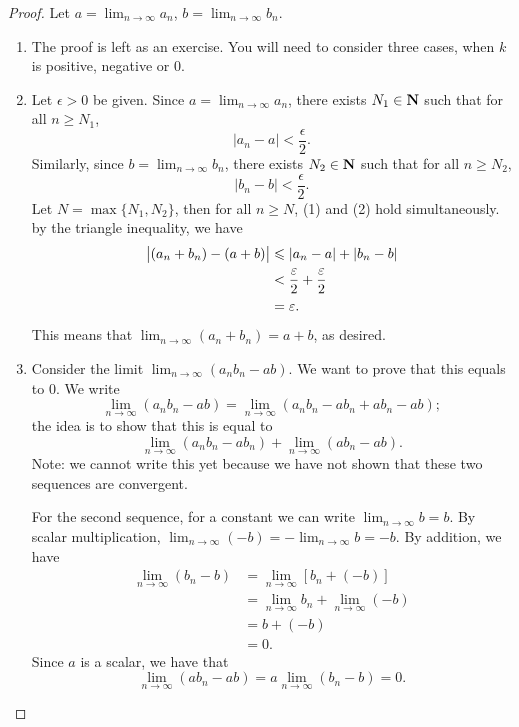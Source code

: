 \begin{proof}
Let $\displaystyle a=\lim_{n\to\infty}a_n$, $\displaystyle b=\lim_{n\to\infty}b_n$.
\begin{enumerate}[label=(\roman*)]
\item The proof is left as an exercise. You will need to consider three cases, when $k$ is positive, negative or $0$.

\item Let $\epsilon>0$ be given. Since $\displaystyle a=\lim_{n\to\infty}a_n$, there exists $N_1\in\mathbf N$ such that for all $n\ge N_1$,
\begin{equation*}\tag{1}
|a_n-a|<\frac{\epsilon}{2}.
\end{equation*}
Similarly, since $\displaystyle b=\lim_{n\to\infty}b_n$, there exists $N_2\in\mathbf N$ such that for all $n\ge N_2$,
\begin{equation*}\tag{2}
|b_n-b|<\frac{\epsilon}{2}.
\end{equation*} 
Let $N=\max\{N_1,N_2\}$, then for all $n\ge N$, (1) and (2) hold simultaneously. by the triangle inequality, we have
\begin{align*}
\left|(a_n+b_n)-(a+b)\right|
&\leqslant|a_n-a|+|b_n-b|\\
&<\frac{\varepsilon}{2}+\frac{\varepsilon}{2}\\
&=\varepsilon.
\end{align*}
This means that $\displaystyle\lim_{n\to\infty}(a_n+b_n)=a+b$, as desired.

\item Consider the limit $\displaystyle\lim_{n\to\infty}(a_nb_n-ab)$. We want to prove that this equals to $0$. We write
\[\lim_{n\to\infty}(a_nb_n-ab)=\lim_{n\to\infty}(a_nb_n-ab_n+ab_n-ab);\]
the idea is to show that this is equal to
\[\lim_{n\to\infty}(a_nb_n-ab_n)+\lim_{n\to\infty}(ab_n-ab).\]
Note: we cannot write this yet because we have not shown that these two sequences are convergent.

For the second sequence, for a constant we can write $\displaystyle\lim_{n\to\infty}b=b$. By scalar multiplication, $\displaystyle\lim_{n\to\infty}(-b)=-\lim_{n\to\infty}b=-b$. By addition, we have 
\begin{align*}
\lim_{n\to\infty}(b_n-b)
&=\lim_{n\to\infty}[b_n+(-b)]\\
&=\lim_{n\to\infty}b_n+\lim_{n\to\infty}(-b)\\
&=b+(-b)\\
&=0.
\end{align*}
Since $a$ is a scalar, we have that
\[\lim_{n\to\infty}(ab_n-ab)=a\lim_{n\to\infty}(b_n-b)=0.\]


\end{enumerate}
\end{proof}
